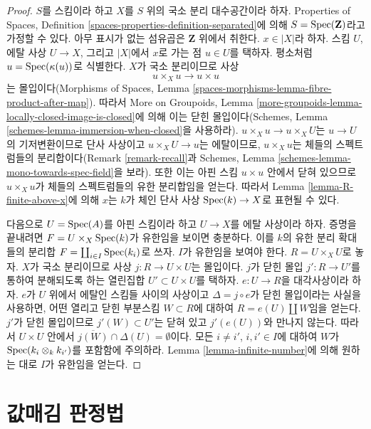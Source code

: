 \begin{proof}
$S$를 스킴이라 하고 $X$를 $S$ 위의 국소 분리 대수공간이라 하자.
Properties of Spaces, Definition
\ref{spaces-properties-definition-separated}에 의해
$S = \mathop{\mathrm{Spec}}(\mathbf{Z})$라고 가정할 수 있다. 아무 표시가 없는
섬유곱은 $\mathbf{Z}$ 위에서 취한다. $x \in |X|$라 하자. 스킴 $U$,
에탈 사상 $U \to X$, 그리고 $|X|$에서 $x$로 가는 점 $u \in U$를
택하자. 평소처럼 $u = \mathop{\mathrm{Spec}}(\kappa(u))$로 식별한다. $X$가 국소
분리이므로 사상
$$
u \times_X u \to u \times u
$$
는 몰입이다(Morphisms of Spaces, Lemma
\ref{spaces-morphisms-lemma-fibre-product-after-map}). 따라서 More on
Groupoids, Lemma
\ref{more-groupoids-lemma-locally-closed-image-is-closed}에 의해 이는
닫힌 몰입이다(Schemes, Lemma
\ref{schemes-lemma-immersion-when-closed}을 사용하라).
$u \times_X u \to u \times_X U$는 $u \to U$의 기저변환이므로 단사
사상이고 $u \times_X U \to u$는 에탈이므로, $u \times_X u$는
체들의 스펙트럼들의 분리합이다(Remark \ref{remark-recall}과 Schemes,
Lemma \ref{schemes-lemma-mono-towards-spec-field}을 보라). 또한 이는
아핀 스킴 $u \times u$ 안에서 닫혀 있으므로 $u \times_X u$가 체들의
스펙트럼들의 유한 분리합임을 얻는다. 따라서 Lemma
\ref{lemma-R-finite-above-x}에 의해 $x$는 $k$가 체인 단사 사상
$\mathop{\mathrm{Spec}}(k) \to X$로 표현될 수 있다.

\medskip\noindent
다음으로 $U = \mathop{\mathrm{Spec}}(A)$를 아핀 스킴이라 하고 $U \to X$를 에탈
사상이라 하자. 증명을 끝내려면
$F = U \times_X \mathop{\mathrm{Spec}}(k)$가 유한임을 보이면 충분하다. 이를 $k$의
유한 분리 확대들의 분리합
$F = \coprod_{i \in I} \mathop{\mathrm{Spec}}(k_i)$로 쓰자. $I$가 유한임을 보여야 한다.
$R = U \times_X U$로 놓자. $X$가 국소 분리이므로 사상
$j : R \to U \times U$는 몰입이다. $j$가 닫힌 몰입
$j' : R \to U'$를 통하여 분해되도록 하는 열린집합
$U' \subset U \times U$를 택하자. $e : U \to R$을 대각사상이라 하자.
$e$가 $U$ 위에서 에탈인 스킴들 사이의 사상이고
$\Delta = j \circ e$가 닫힌 몰입이라는 사실을 사용하면, 어떤 열리고
닫힌 부분스킴 $W \subset R$에 대하여
$R = e(U) \amalg W$임을 얻는다. $j'$가 닫힌 몰입이므로
$j'(W) \subset U'$는 닫혀 있고 $j'(e(U))$와 만나지 않는다. 따라서
$U \times U$ 안에서
$\overline{j(W)} \cap \Delta(U) = \emptyset$이다. 모든
$i \not = i'$, $i, i' \in I$에 대하여 $W$가
$\mathop{\mathrm{Spec}}(k_i \otimes_k k_{i'})$를 포함함에 주의하라. Lemma
\ref{lemma-infinite-number}에 의해 원하는 대로 $I$가 유한임을 얻는다.
\end{proof}






\section{값매김 판정법}
\label{section-valuative-criterion-universally-closed}

